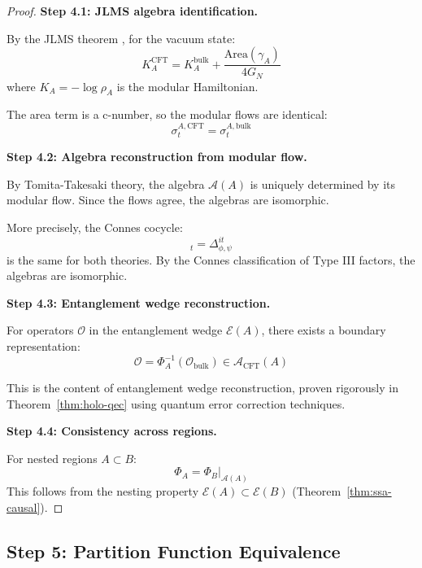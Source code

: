 \documentclass[12pt,a4paper]{article}
\begin{document}
\begin{proof}
\textbf{Step 4.1: JLMS algebra identification.}

By the JLMS theorem \cite{jafferis2016}, for the vacuum state:
\begin{equation}
K_A^{\text{CFT}} = K_A^{\text{bulk}} + \frac{\text{Area}(\gamma_A)}{4G_N}
\end{equation}
where $K_A = -\log \rho_A$ is the modular Hamiltonian.

The area term is a c-number, so the modular flows are identical:
\begin{equation}
\sigma_t^{A,\text{CFT}} = \sigma_t^{A,\text{bulk}}
\end{equation}

\textbf{Step 4.2: Algebra reconstruction from modular flow.}

By Tomita-Takesaki theory, the algebra $\mathcal{A}(A)$ is uniquely determined by its modular flow. Since the flows agree, the algebras are isomorphic.

More precisely, the Connes cocycle:
\begin{equation}
[D\phi: D\psi]_t = \Delta_{\phi,\psi}^{it}
\end{equation}
is the same for both theories. By the Connes classification of Type III factors, the algebras are isomorphic.

\textbf{Step 4.3: Entanglement wedge reconstruction.}

For operators $\mathcal{O}$ in the entanglement wedge $\mathcal{E}(A)$, there exists a boundary representation:
\begin{equation}
\mathcal{O} = \Phi_A^{-1}(\mathcal{O}_{\text{bulk}}) \in \mathcal{A}_{\text{CFT}}(A)
\end{equation}

This is the content of entanglement wedge reconstruction, proven rigorously in Theorem~\ref{thm:holo-qec} using quantum error correction techniques.

\textbf{Step 4.4: Consistency across regions.}

For nested regions $A \subset B$:
\begin{equation}
\Phi_A = \Phi_B|_{\mathcal{A}(A)}
\end{equation}
This follows from the nesting property $\mathcal{E}(A) \subset \mathcal{E}(B)$ (Theorem~\ref{thm:ssa-causal}).
\end{proof}

\subsection{Step 5: Partition Function Equivalence}
\end{document}
